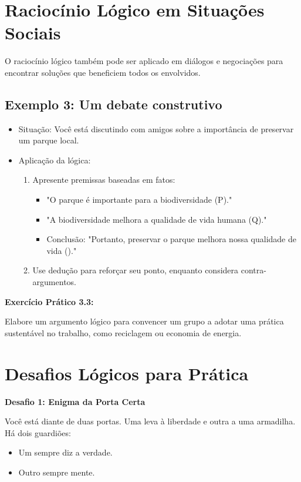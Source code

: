 \documentclass[a4paper,12pt]{book}
\begin{document}
\newpage

\section{Raciocínio Lógico em Situações Sociais}

O raciocínio lógico também pode ser aplicado em diálogos e negociações para encontrar soluções que beneficiem todos os envolvidos.

\subsection*{Exemplo 3: Um debate construtivo}
\begin{itemize}
\item Situação: Você está discutindo com amigos sobre a importância de preservar um parque local.
\item Aplicação da lógica:
\begin{enumerate}
\item Apresente premissas baseadas em fatos:
\begin{itemize}
\item "O parque é importante para a biodiversidade (P)."
\item "A biodiversidade melhora a qualidade de vida humana (Q)."
\item Conclusão: "Portanto, preservar o parque melhora nossa qualidade de vida ()."
\end{itemize}
\item Use dedução para reforçar seu ponto, enquanto considera contra-argumentos.
\end{enumerate}
\end{itemize}

\textbf{Exercício Prático 3.3:}

Elabore um argumento lógico para convencer um grupo a adotar uma prática sustentável no trabalho, como reciclagem ou economia de energia.

\section{Desafios Lógicos para Prática}

\textbf{Desafio 1: Enigma da Porta Certa}

Você está diante de duas portas. Uma leva à liberdade e outra a uma armadilha. Há dois guardiões:
\begin{itemize}
\item Um sempre diz a verdade.
\item Outro sempre mente.
\end{itemize}
\end{document}
